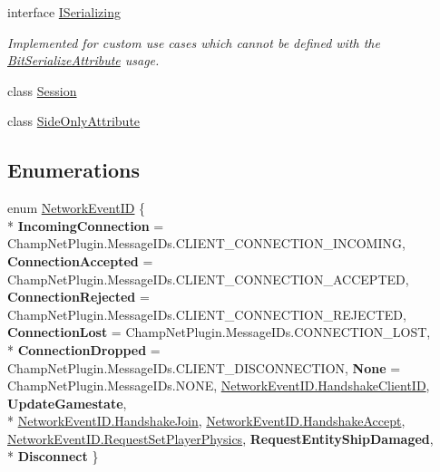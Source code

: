 \begin{DoxyCompactItemize}
interface \hyperlink{interface_skyrates_1_1_common_1_1_network_1_1_i_serializing}{I\-Serializing}
\begin{DoxyCompactList}\small\item\em Implemented for custom use cases which cannot be defined with the \hyperlink{class_skyrates_1_1_common_1_1_network_1_1_bit_serialize_attribute}{Bit\-Serialize\-Attribute} usage. \end{DoxyCompactList}\item 
class \hyperlink{class_skyrates_1_1_common_1_1_network_1_1_session}{Session}
\item 
class \hyperlink{class_skyrates_1_1_common_1_1_network_1_1_side_only_attribute}{Side\-Only\-Attribute}
\end{DoxyCompactItemize}
\subsection*{Enumerations}
\begin{DoxyCompactItemize}
\item 
enum \hyperlink{namespace_skyrates_1_1_common_1_1_network_a90fc6faa44c44b4284114e861d3e761a}{Network\-Event\-I\-D} \{ \\*
{\bfseries Incoming\-Connection} = Champ\-Net\-Plugin.\-Message\-I\-Ds.\-C\-L\-I\-E\-N\-T\-\_\-\-C\-O\-N\-N\-E\-C\-T\-I\-O\-N\-\_\-\-I\-N\-C\-O\-M\-I\-N\-G, 
{\bfseries Connection\-Accepted} = Champ\-Net\-Plugin.\-Message\-I\-Ds.\-C\-L\-I\-E\-N\-T\-\_\-\-C\-O\-N\-N\-E\-C\-T\-I\-O\-N\-\_\-\-A\-C\-C\-E\-P\-T\-E\-D, 
{\bfseries Connection\-Rejected} = Champ\-Net\-Plugin.\-Message\-I\-Ds.\-C\-L\-I\-E\-N\-T\-\_\-\-C\-O\-N\-N\-E\-C\-T\-I\-O\-N\-\_\-\-R\-E\-J\-E\-C\-T\-E\-D, 
{\bfseries Connection\-Lost} = Champ\-Net\-Plugin.\-Message\-I\-Ds.\-C\-O\-N\-N\-E\-C\-T\-I\-O\-N\-\_\-\-L\-O\-S\-T, 
\\*
{\bfseries Connection\-Dropped} = Champ\-Net\-Plugin.\-Message\-I\-Ds.\-C\-L\-I\-E\-N\-T\-\_\-\-D\-I\-S\-C\-O\-N\-N\-E\-C\-T\-I\-O\-N, 
{\bfseries None} = Champ\-Net\-Plugin.\-Message\-I\-Ds.\-N\-O\-N\-E, 
\hyperlink{namespace_skyrates_1_1_common_1_1_network_a90fc6faa44c44b4284114e861d3e761aa908d5d0d1dcdac6a031195157436dbc3}{Network\-Event\-I\-D.\-Handshake\-Client\-I\-D}, 
{\bfseries Update\-Gamestate}, 
\\*
\hyperlink{namespace_skyrates_1_1_common_1_1_network_a90fc6faa44c44b4284114e861d3e761aae1ed8fdcd01caace5506395496004e93}{Network\-Event\-I\-D.\-Handshake\-Join}, 
\hyperlink{namespace_skyrates_1_1_common_1_1_network_a90fc6faa44c44b4284114e861d3e761aa687268a9c39eb0452e4bf727ebc788f0}{Network\-Event\-I\-D.\-Handshake\-Accept}, 
\hyperlink{namespace_skyrates_1_1_common_1_1_network_a90fc6faa44c44b4284114e861d3e761aa4580f9f0cb71411e3ef1bf8023965089}{Network\-Event\-I\-D.\-Request\-Set\-Player\-Physics}, 
{\bfseries Request\-Entity\-Ship\-Damaged}, 
\\*
{\bfseries Disconnect}
 \}
\end{DoxyCompactItemize}

